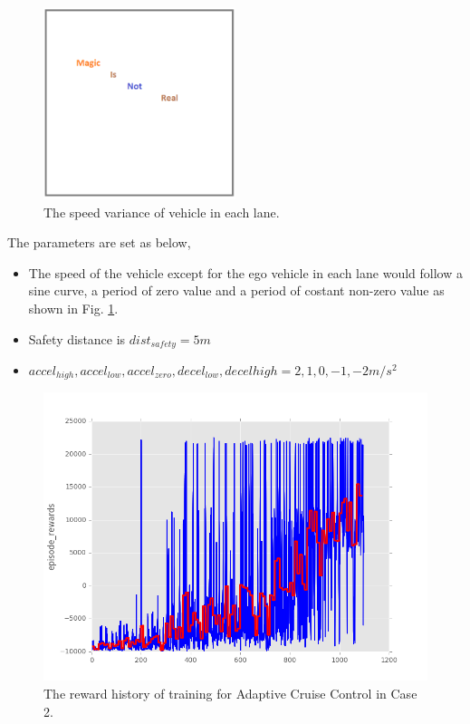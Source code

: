 \begin{figure}[h]
\centering
\includegraphics[width=0.5\textwidth]{figs/magic}
\caption{The speed variance of vehicle in each lane.}
\label{fig:erratic-curve}
\end{figure}

The parameters are set as below,

\begin{itemize}
\item The speed of the vehicle except for the ego vehicle in each lane would follow a sine curve, a period of zero value and a period of costant non-zero value as shown in Fig.  \ref{fig:erratic-curve}.
\item Safety distance is  $dist_{safety} = 5 m$
\item $accel_{high}, accel_{low}, accel_{zero}, decel_{low}, decel{high} = {2, 1, 0, -1, -2} m/s^2$
\end{itemize}

\begin{figure}[h]
\centering
\includegraphics[width=1.0\textwidth]{figs/ch5/agent1-reward-history-epoch-1000-b}
\caption{The reward history of training for Adaptive Cruise Control in Case 2.}
\label{fig:res-1-b}
\end{figure}

